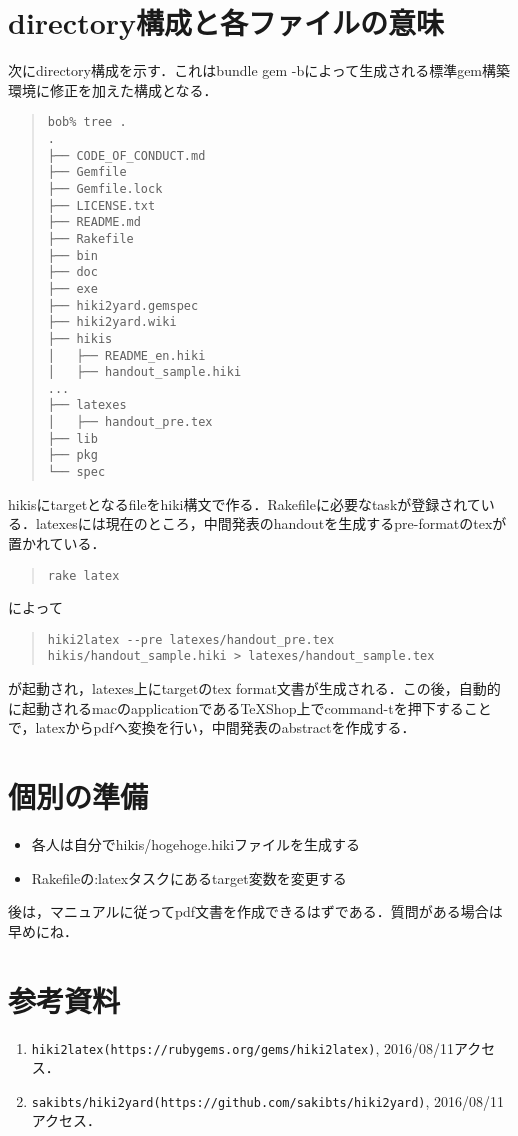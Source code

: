 \documentclass[10pt,a4j,twocolumn]{jsarticle}
\begin{document}
\section{directory構成と各ファイルの意味}
次にdirectory構成を示す．これはbundle gem -bによって生成される標準gem構築環境に修正を加えた構成となる．
\begin{quote}\begin{verbatim}
bob% tree .
.
├── CODE_OF_CONDUCT.md
├── Gemfile
├── Gemfile.lock
├── LICENSE.txt
├── README.md
├── Rakefile
├── bin
├── doc
├── exe
├── hiki2yard.gemspec
├── hiki2yard.wiki
├── hikis
│   ├── README_en.hiki
│   ├── handout_sample.hiki
...
├── latexes
│   ├── handout_pre.tex
├── lib
├── pkg
└── spec
\end{verbatim}\end{quote}
hikisにtargetとなるfileをhiki構文で作る．Rakefileに必要なtaskが登録されている．latexesには現在のところ，中間発表のhandoutを生成するpre-formatのtexが置かれている．
\begin{quote}\begin{verbatim}
rake latex
\end{verbatim}\end{quote}
によって
\begin{quote}\begin{verbatim}
hiki2latex --pre latexes/handout_pre.tex hikis/handout_sample.hiki > latexes/handout_sample.tex
\end{verbatim}\end{quote}
が起動され，latexes上にtargetのtex format文書が生成される．この後，自動的に起動されるmacのapplicationであるTeXShop上でcommand-tを押下することで，latexからpdfへ変換を行い，中間発表のabstractを作成する．

\section{個別の準備}\begin{itemize}
\item 各人は自分でhikis/hogehoge.hikiファイルを生成する
\item Rakefileの:latexタスクにあるtarget変数を変更する
\end{itemize}
後は，マニュアルに従ってpdf文書を作成できるはずである．質問がある場合は早めにね．

\section{参考資料}\begin{enumerate}
\item \verb|hiki2latex(https://rubygems.org/gems/hiki2latex)|, 2016/08/11アクセス．
\item \verb|sakibts/hiki2yard(https://github.com/sakibts/hiki2yard)|, 2016/08/11アクセス．
\end{enumerate}
\end{document}
